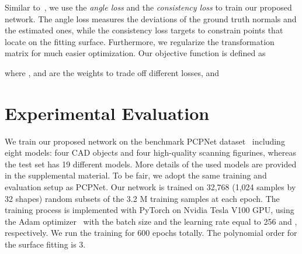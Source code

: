 \documentclass[runningheads]{llncs}
\begin{document}
 Similar to~\cite{ben2020deepfit}, we use the \emph{angle loss} and the \emph{consistency loss} to train our proposed network. The angle loss measures the deviations of the ground truth normals and the estimated ones, while the consistency loss targets to constrain points that locate on the fitting surface. Furthermore, we regularize the transformation matrix for much easier optimization. Our objective function is defined as 

where ,  and  are the weights to trade off different losses, and 




\section{Experimental Evaluation}\label{sec:exp}
 We train our proposed network on the benchmark PCPNet dataset~\cite{guerrero2018pcpnet} including eight models: four CAD objects and four high-quality scanning figurines, whereas the test set has 19 different models. More details of the used models are provided in the supplemental material. To be fair, we adopt the same training and evaluation setup as PCPNet. Our network is trained on 32,768 (1,024 samples by 32 shapes) random subsets of the 3.2 M training samples at each epoch. The training process is implemented with PyTorch on Nvidia Tesla V100 GPU, using the Adam optimizer~\cite{kingma2014adam} with the batch size and the learning rate equal to 256 and , respectively. We run the training for 600 epochs totally. The polynomial order  for the surface fitting is 3. 
\end{document}
